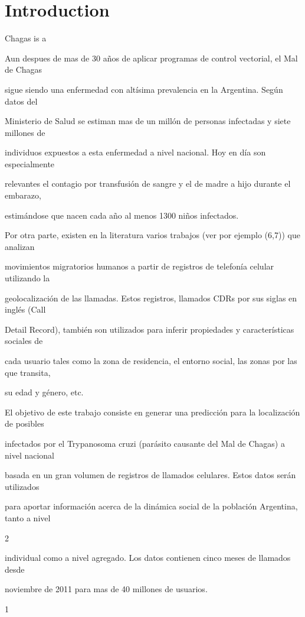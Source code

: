 \section{Introduction}

Chagas is a 

Aun despues de mas de 30 años de aplicar programas de control vectorial, el Mal de Chagas

sigue siendo una enfermedad con altísima prevalencia en la Argentina. Según datos del

Ministerio de Salud se estiman mas de un millón de personas infectadas y siete millones de

individuos expuestos a esta enfermedad a nivel nacional. Hoy en día son especialmente

relevantes el contagio por transfusión de sangre y el de madre a hijo durante el embarazo,

estimándose que nacen cada año al menos 1300 niños infectados.

Por otra parte, existen en la literatura varios trabajos (ver por ejemplo (6,7)) que analizan

movimientos migratorios humanos a partir de registros de telefonía celular utilizando la

geolocalización de las llamadas. Estos registros, llamados CDRs por sus siglas en inglés (Call

Detail Record), también son utilizados para inferir propiedades y características sociales de

cada usuario tales como la zona de residencia, el entorno social, las zonas por las que transita,

su edad y género, etc.

El objetivo de este trabajo consiste en generar una predicción para la localización de posibles

infectados por el Trypanosoma cruzi (parásito causante del Mal de Chagas) a nivel nacional

basada en un gran volumen de registros de llamados celulares. Estos datos serán utilizados

para aportar información acerca de la dinámica social de la población Argentina, tanto a nivel

2

individual como a nivel agregado. Los datos contienen cinco meses de llamados desde

noviembre de 2011 para mas de 40 millones de usuarios.

1